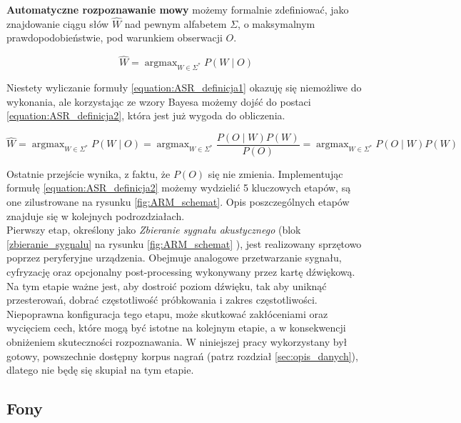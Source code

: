 \documentclass[11pt]{article}
\DeclareMathOperator*{\argmax}{\arg\max}   %
\newcommand{\refBlock}[1]{%
	\hyperref[#1]{\ref*{#1}}%
}
\begin{document}
	\textbf{Automatyczne rozpoznawanie mowy} możemy formalnie zdefiniować, jako znajdowanie ciągu słów $\hat{W}$ nad pewnym alfabetem $\Sigma$, o maksymalnym prawdopodobieństwie, pod warunkiem obserwacji $O$.
	
	\begin{equation}
		\hat{W}=\argmax_{W \in \Sigma^{*}}{P(W \mid O)}
		\label{equation:ASR_definicja1}
	\end{equation}
	
	Niestety wyliczanie formuły \ref{equation:ASR_definicja1} okazuję się niemożliwe do wykonania, ale korzystając ze wzory Bayesa możemy dojść do postaci \ref{equation:ASR_definicja2}, która jest już wygoda do obliczenia.
	
	\begin{equation}
		\hat{W}=\argmax_{W \in \Sigma^{*}}{P(W \mid O)} = \argmax_{W \in \Sigma^{*}}{\frac{P(O \mid W)P(W)}{P(O)}} = \argmax_{W \in \Sigma^{*}}{P(O \mid W)P(W)}
		\label{equation:ASR_definicja2}
	\end{equation}
	
	Ostatnie przejście wynika, z faktu, że $P(O)$ się nie zmienia.
	Implementując formułę \ref{equation:ASR_definicja2} możemy wydzielić 5 kluczowych etapów, są one zilustrowane na rysunku \ref{fig:ARM_schemat}. Opis poszczególnych etapów znajduje się w kolejnych podrozdziałach.
	\\
	Pierwszy etap, określony jako \textit{Zbieranie sygnału akustycznego} (blok \refBlock{zbieranie_sygnalu} na rysunku \ref{fig:ARM_schemat} ), jest realizowany sprzętowo poprzez peryferyjne urządzenia. Obejmuje analogowe przetwarzanie sygnału, cyfryzację oraz opcjonalny post-processing wykonywany przez kartę dźwiękową. Na tym etapie ważne jest, aby dostroić poziom dźwięku, tak aby uniknąć przesterowań, dobrać częstotliwość próbkowania i zakres częstotliwości. Niepoprawna konfiguracja tego etapu, może skutkować zakłóceniami oraz wycięciem cech, które mogą być istotne na kolejnym etapie, a w konsekwencji obniżeniem skuteczności rozpoznawania. W niniejszej pracy wykorzystany był gotowy, powszechnie dostępny korpus nagrań (patrz rozdział \ref{sec:opis_danych}), dlatego nie będę się skupiał na tym etapie.

	\subsection{ Fony }
	
\end{document}
